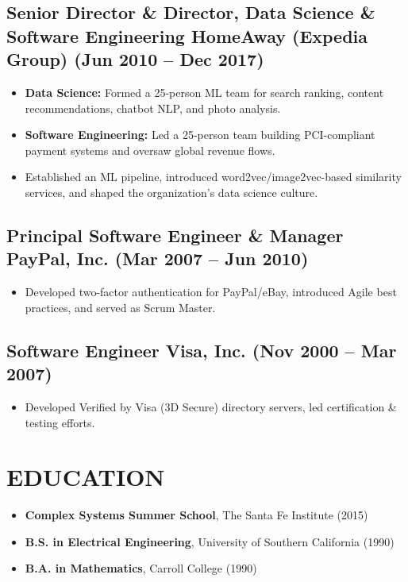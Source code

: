 \documentclass[11pt]{article}
\begin{document}
\subsection*{Senior Director \& Director, Data Science \& Software Engineering \hfill HomeAway (Expedia Group) (Jun 2010 -- Dec 2017)}
\begin{itemize}[leftmargin=*]
  \item \textbf{Data Science:} Formed a 25-person ML team for search ranking, content recommendations, chatbot NLP, and photo analysis.
  \item \textbf{Software Engineering:} Led a 25-person team building PCI-compliant payment systems and oversaw global revenue flows.
  \item Established an ML pipeline, introduced word2vec/image2vec-based similarity services, and shaped the organization’s data science culture.
\end{itemize}

\subsection*{Principal Software Engineer \& Manager \hfill PayPal, Inc. (Mar 2007 -- Jun 2010)}
\begin{itemize}[leftmargin=*]
  \item Developed two-factor authentication for PayPal/eBay, introduced Agile best practices, and served as Scrum Master.
\end{itemize}

\subsection*{Software Engineer \hfill Visa, Inc. (Nov 2000 -- Mar 2007)}
\begin{itemize}[leftmargin=*]
  \item Developed Verified by Visa (3D Secure) directory servers, led certification \& testing efforts.
\end{itemize}

\section*{EDUCATION}
\begin{itemize}[leftmargin=*]
  \item \textbf{Complex Systems Summer School}, The Santa Fe Institute (2015)
  \item \textbf{B.S. in Electrical Engineering}, University of Southern California (1990)
  \item \textbf{B.A. in Mathematics}, Carroll College (1990)
\end{itemize}
\end{document}
